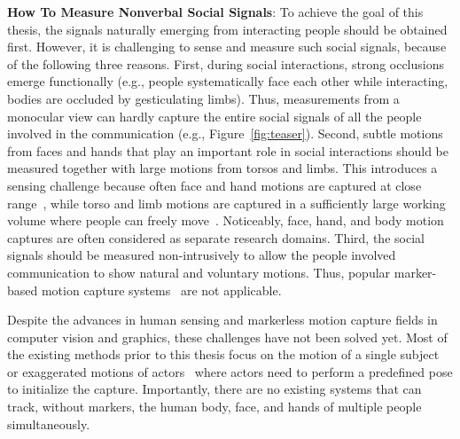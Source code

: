 \noindent \textbf{How To Measure Nonverbal Social Signals}:  
To achieve the goal of this thesis, the signals naturally emerging from interacting people should be obtained first. However, it is challenging to sense and measure such social signals, because of the following three reasons. First, during social interactions, strong occlusions emerge functionally (e.g., people systematically face each other while interacting, bodies are occluded by gesticulating limbs). Thus, measurements from a monocular view can hardly capture the entire social signals of all the people involved in the communication (e.g., Figure~\ref{fig:teaser}). Second, subtle motions from faces and hands that play an important role in social interactions should be measured together with large motions from torsos and limbs. This introduces a sensing challenge because often face and hand motions are captured at close range~\cite{Beeler:SIGGRAPH2010,ghosh2011multiview, Beeler:SIGGRAPH2011, bradley2010high, valgaerts2012lightweight, Oikonomidis-12, Tompson-14a, Sridha-15, Tzionas-16}, while torso and limb motions are captured in a sufficiently large working volume where people can freely move~\cite{deAguiar-2008, Gall-09, Stoll-11, Elhayek-15}. Noticeably, face, hand, and body motion captures are often considered as separate research domains. Third, the social signals should be measured non-intrusively to allow the people involved communication to show natural and voluntary motions. Thus, popular marker-based motion capture systems~\cite{VICON} are not applicable. 

Despite the advances in human sensing and markerless motion capture fields in computer vision and graphics, these challenges have not been solved yet. Most of the existing methods prior to this thesis focus on the motion of a single subject~\cite{deAguiar-2008,Vlasic-2009,Furukawa2008,Gall-09, Stoll-11, Baak-13,Shotton-13} or exaggerated motions of actors~\cite{Ye-2012,Liu-2013} where actors need to perform a predefined pose to initialize the capture. Importantly, there are no existing systems that can track, without markers, the human body, face, and hands of multiple people simultaneously.

